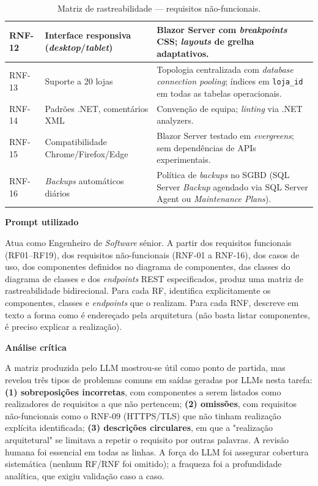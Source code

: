 \begin{table}[H]
\begin{tabular}{|p{1.5cm}|p{4.5cm}|p{8cm}|}
\hline
RNF-12 & Interface responsiva (\textit{desktop}/\textit{tablet}) & Blazor Server com \textit{breakpoints} CSS; \textit{layouts} de grelha adaptativos. \\
\hline
RNF-13 & Suporte a 20 lojas & Topologia centralizada com \textit{database connection pooling}; índices em \texttt{loja\_id} em todas as tabelas operacionais. \\
\hline
RNF-14 & Padrões .NET, comentários XML & Convenção de equipa; \textit{linting} via .NET analyzers. \\
\hline
RNF-15 & Compatibilidade Chrome/Firefox/Edge & Blazor Server testado em \textit{evergreens}; sem dependências de APIs experimentais. \\
\hline
RNF-16 & \textit{Backups} automáticos diários & Política de \textit{backups} no SGBD (SQL Server \textit{Backup} agendado via SQL Server Agent ou \textit{Maintenance Plans}). \\
\hline
\end{tabular}
\caption{Matriz de rastreabilidade --- requisitos não-funcionais.}
\label{tab:rastreabilidade-rnf}
\end{table}

    \begin{tcolorbox}[title=Interação com o LLM]
    \textbf{Prompt utilizado}

    Atua como Engenheiro de \textit{Software} sénior. A partir dos requisitos funcionais (RF01--RF19), dos requisitos não-funcionais (RNF-01 a RNF-16), dos casos de uso, dos componentes definidos no diagrama de componentes, das classes do diagrama de classes e dos \textit{endpoints} REST especificados, produz uma matriz de rastreabilidade bidirecional. Para cada RF, identifica explicitamente os componentes, classes e \textit{endpoints} que o realizam. Para cada RNF, descreve em texto a forma como é endereçado pela arquitetura (não basta listar componentes, é preciso explicar a realização).

    \tcblower

    \textbf{Análise crítica}

    A matriz produzida pelo LLM mostrou-se útil como ponto de partida, mas revelou três tipos de problemas comuns em saídas geradas por LLMs nesta tarefa: \textbf{(1) sobreposições incorretas}, com componentes a serem listados como realizadores de requisitos a que não pertencem; \textbf{(2) omissões}, com requisitos não-funcionais como o RNF-09 (HTTPS/TLS) que não tinham realização explícita identificada; \textbf{(3) descrições circulares}, em que a "realização arquitetural" se limitava a repetir o requisito por outras palavras. A revisão humana foi essencial em todas as linhas. A força do LLM foi assegurar cobertura sistemática (nenhum RF/RNF foi omitido); a fraqueza foi a profundidade analítica, que exigiu validação caso a caso.
    \end{tcolorbox}

